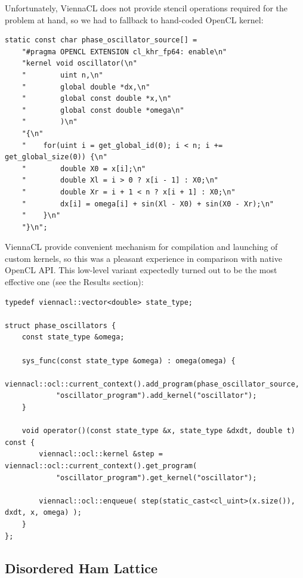 \documentclass[1p]{elsarticle}
\begin{document}
Unfortunately, ViennaCL does not provide stencil operations required for
the problem at hand, so we had to fallback to hand-coded OpenCL kernel:
\begin{lstlisting}
static const char phase_oscillator_source[] =
    "#pragma OPENCL EXTENSION cl_khr_fp64: enable\n"
    "kernel void oscillator(\n"
    "        uint n,\n"
    "        global double *dx,\n"
    "        global const double *x,\n"
    "        global const double *omega\n"
    "        )\n"
    "{\n"
    "    for(uint i = get_global_id(0); i < n; i += get_global_size(0)) {\n"
    "        double X0 = x[i];\n"
    "        double Xl = i > 0 ? x[i - 1] : X0;\n"
    "        double Xr = i + 1 < n ? x[i + 1] : X0;\n"
    "        dx[i] = omega[i] + sin(Xl - X0) + sin(X0 - Xr);\n"
    "    }\n"
    "}\n";
\end{lstlisting}
ViennaCL provide convenient mechanism for compilation and launching of custom
kernels, so this was a pleasant experience in comparison with native OpenCL
API. This low-level variant expectedly turned out to be the most effective one
(see the Results section):
\begin{lstlisting}[firstnumber=last]
typedef viennacl::vector<double> state_type;

struct phase_oscillators {
    const state_type &omega;

    sys_func(const state_type &omega) : omega(omega) {
        viennacl::ocl::current_context().add_program(phase_oscillator_source,
            "oscillator_program").add_kernel("oscillator");
    }

    void operator()(const state_type &x, state_type &dxdt, double t) const {
        viennacl::ocl::kernel &step = viennacl::ocl::current_context().get_program(
            "oscillator_program").get_kernel("oscillator");

        viennacl::ocl::enqueue( step(static_cast<cl_uint>(x.size()), dxdt, x, omega) );
    }
};
\end{lstlisting}








%
%
\subsection{Disordered Ham Lattice}
\end{document}
